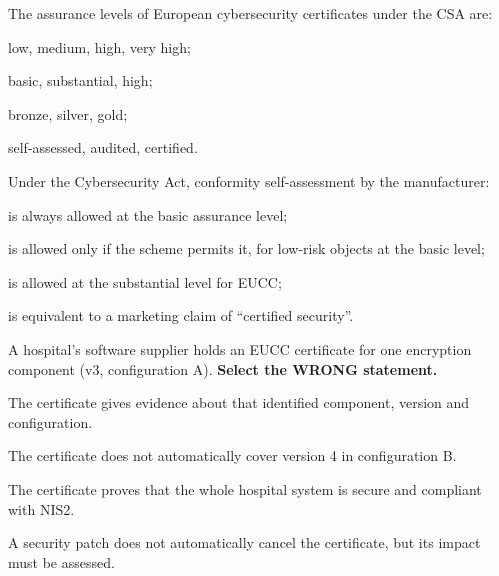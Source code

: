 \begin{domanda}\label{q:livelli}
The assurance levels of European cybersecurity certificates under the CSA are:
\begin{opzioni}
  \item low, medium, high, very high;
  \item basic, substantial, high;
  \item bronze, silver, gold;
  \item self-assessed, audited, certified.
\end{opzioni}
\end{domanda}

\begin{domanda}\label{q:csa-self}
Under the Cybersecurity Act, conformity self-assessment by the manufacturer:
\begin{opzioni}
  \item is always allowed at the basic assurance level;
  \item is allowed only if the scheme permits it, for low-risk objects at the basic level;
  \item is allowed at the substantial level for EUCC;
  \item is equivalent to a marketing claim of ``certified security''.
\end{opzioni}
\end{domanda}

\begin{domanda}\label{q:csa-cert}
A hospital's software supplier holds an EUCC certificate for one encryption component (v3, configuration
A). \textbf{Select the WRONG statement.}
\begin{opzioni}
  \item The certificate gives evidence about that identified component, version and configuration.
  \item The certificate does not automatically cover version 4 in configuration B.
  \item The certificate proves that the whole hospital system is secure and compliant with NIS2.
  \item A security patch does not automatically cancel the certificate, but its impact must be assessed.
\end{opzioni}
\end{domanda}

